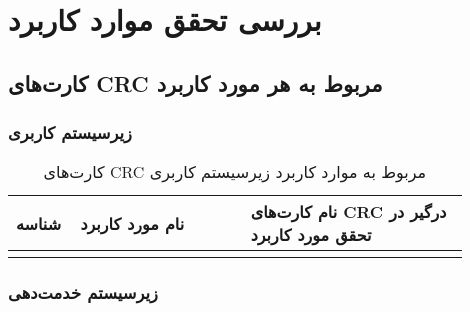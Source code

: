 

\chapter{بررسی تحقق موارد کاربرد}


\section{کارت‌های CRC مربوط به هر مورد کاربرد}

\subsection{زیرسیستم کاربری}

\begin{table}[ht!]
	\centering
	\begin{tabular}{|p{0.1\linewidth}|p{0.35\linewidth}|p{0.45\linewidth}|} 
				\hline
			 شناسه  & نام مورد کاربرد  & نام کارت‌های CRC درگیر در تحقق مورد کاربرد\\ 
		\hline
		\usecasecrcitem{ثبت نام}{کاربر }
		\usecasecrcitem{ورود}{کاربر }
		\usecasecrcitem{ورود}{کاربر }
		\usecasecrcitem{خروج}{کاربر }
		\usecasecrcitem{جست‌وجوی کاربران}{کاربر، مدیر شرکت}
		\usecasecrcitem{مشاهده کاربران}{کاربر، مدیر شرکت}
		\usecasecrcitem{تایید متخصص}{مدیر شرکت، متخصص}
		\usecasecrcitem{اضافه کردن مدیر جدید}{کاربر، مدیر شرکت}
		\usecasecrcitem{فعال یا غیرفعال کردن متخصص}{کاربر، متخصص}
		
	\end{tabular}
	\caption{کارت‌های CRC مربوط به موارد کاربرد زیرسیستم کاربری}
\end{table}

\newpage
\subsection{زیرسیستم خدمت‌دهی}


